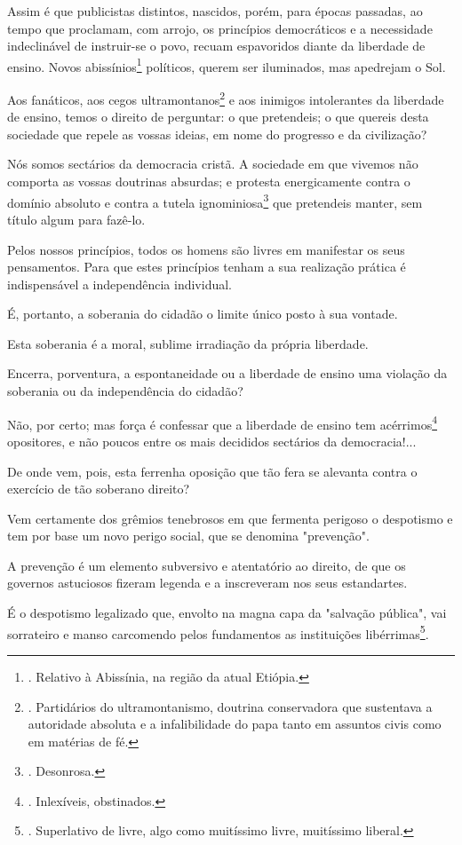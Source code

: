 Assim é que publicistas distintos, nascidos, porém, para épocas
passadas, ao tempo que proclamam, com arrojo, os princípios democráticos
e a necessidade indeclinável de instruir-se o povo, recuam espavoridos
diante da liberdade de ensino. Novos abissínios\footnote{. Relativo à
  Abissínia, na região da atual Etiópia.} políticos, querem ser
iluminados, mas apedrejam o Sol.

Aos fanáticos, aos cegos ultramontanos\footnote{. Partidários do
  ultramontanismo, doutrina conservadora que sustentava a autoridade
  absoluta e a infalibilidade do papa tanto em assuntos civis como em
  matérias de fé.} e aos inimigos intolerantes da liberdade de ensino,
temos o direito de perguntar: o que pretendeis; o que quereis desta
sociedade que repele as vossas ideias, em nome do progresso e da
civilização?

Nós somos sectários da democracia cristã. A sociedade em que vivemos não
comporta as vossas doutrinas absurdas; e protesta energicamente contra o
domínio absoluto e contra a tutela ignominiosa\footnote{. Desonrosa.}
que pretendeis manter, sem título algum para fazê-lo.

Pelos nossos princípios, todos os homens são livres em manifestar os
seus pensamentos. Para que estes princípios tenham a sua realização
prática é indispensável a independência individual.

É, portanto, a soberania do cidadão o limite único posto à sua vontade.

Esta soberania é a moral, sublime irradiação da própria liberdade.

Encerra, porventura, a espontaneidade ou a liberdade de ensino uma
violação da soberania ou da independência do cidadão?

Não, por certo; mas força é confessar que a liberdade de ensino tem
acérrimos\footnote{. Inlexíveis, obstinados.} opositores, e não poucos
entre os mais decididos sectários da democracia!...

De onde vem, pois, esta ferrenha oposição que tão fera se alevanta
contra o exercício de tão soberano direito?

Vem certamente dos grêmios tenebrosos em que fermenta perigoso o
despotismo e tem por base um novo perigo social, que se denomina
"prevenção".

A prevenção é um elemento subversivo e atentatório ao direito, de que os
governos astuciosos fizeram legenda e a inscreveram nos seus
estandartes.

É o despotismo legalizado que, envolto na magna capa da "salvação
pública", vai sorrateiro e manso carcomendo pelos fundamentos as
instituições libérrimas\footnote{. Superlativo de livre, algo como
  muitíssimo livre, muitíssimo liberal.}.

